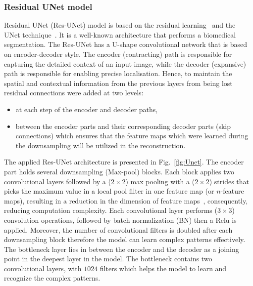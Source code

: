 \subsubsection{Residual UNet model}
Residual UNet (Res-UNet) model is based on the residual learning~\cite{He2016} and the UNet technique~\cite{Ronneberger2015}. 
It is a well-known architecture that performs a biomedical segmentation. 
The Res-UNet has a U-shape convolutional network that is based on encoder-decoder style. 
The encoder (contracting) path is responsible for capturing the detailed context of an input image, while the decoder (expansive) path is responsible for enabling precise localisation. 
Hence, to maintain the spatial and contextual information from the previous layers from being lost residual connections were added at two levels:
\begin{itemize}
	\item at each step of the encoder and decoder paths,
	\item between the encoder parts and their corresponding decoder parts (skip connections) which ensures that the feature maps which were learned during the downsampling will be utilized in the reconstruction. 
\end{itemize}
The applied Res-UNet architecture is presented in Fig.~\ref{fig:Unet}.
The encoder part holds several downsampling (Max-pool) blocks. 
Each block applies two convolutional layers followed by a (\(2\times2\)) max pooling with a (\(2\times2\)) strides that picks the maximum value in a local pool filter in one feature map (or \(n\)-feature maps), resulting in a reduction in the dimension of feature maps~\cite{Lecun2015}, consequently, reducing computation complexity.
Each convolutional layer performs (\(3\times3\)) convolution operations, followed by batch normalization (BN) then a Relu is applied.
Moreover, the number of convolutional filters is doubled after each downsampling block therefore the model can learn complex patterns effectively. 
The bottleneck layer lies in between the encoder and the decoder as a joining point in the deepest layer in the model.
The bottleneck contains two convolutional layers, with \(1024\) filters which helps the model to learn and recognize the complex patterns.

